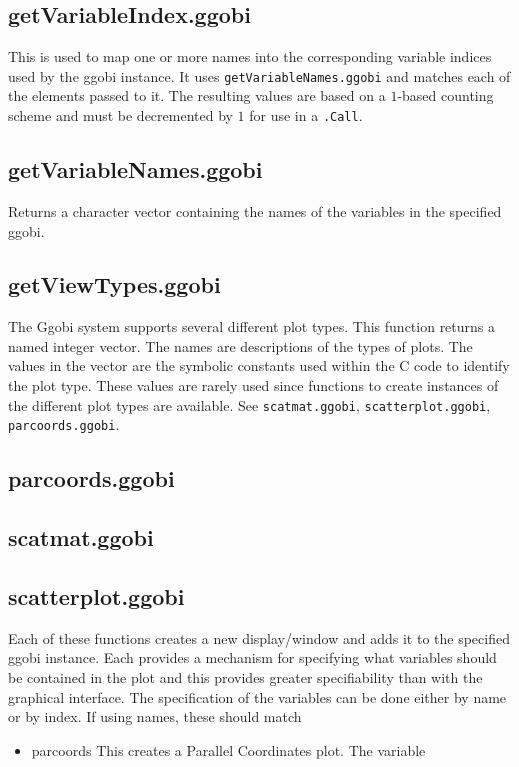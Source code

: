 \documentclass{article}
\def\SFunction#1{{\texttt{\red #1}}}
\begin{document}
\subsection{getVariableIndex.ggobi}
This is used to map one or more names into the corresponding variable
indices used by the ggobi instance.  It uses
\SFunction{getVariableNames.ggobi} and matches each of the elements
passed to it.
The resulting values are based on a $1$-based
counting scheme and must be decremented by $1$ for
use in a \SFunction{.Call}.

\subsection{getVariableNames.ggobi}
Returns  a character vector containing the names of the variables in
the specified ggobi.

\subsection{getViewTypes.ggobi}
The Ggobi system supports several different plot types. This function
returns a named integer vector. The names are descriptions of the
types of plots.  The values in the vector are the symbolic constants
used within the C code to identify the plot type.  These values are
rarely used since functions to create instances of the different plot
types are available.  See \SFunction{scatmat.ggobi},
\SFunction{scatterplot.ggobi}, \SFunction{parcoords.ggobi}.

\subsection{parcoords.ggobi}
\subsection{scatmat.ggobi}
\subsection{scatterplot.ggobi}
Each of these functions creates a new display/window and adds it to
the specified ggobi instance.  Each provides a mechanism for
specifying what variables should be contained in the plot and this
provides greater specifiability than with the graphical interface.
The specification of the variables can be done either by 
name or by index.
If using names, these should match
\begin{itemize}
\item{parcoords}
This creates a Parallel Coordinates plot.
The variable
\end{itemize}
\end{document}
